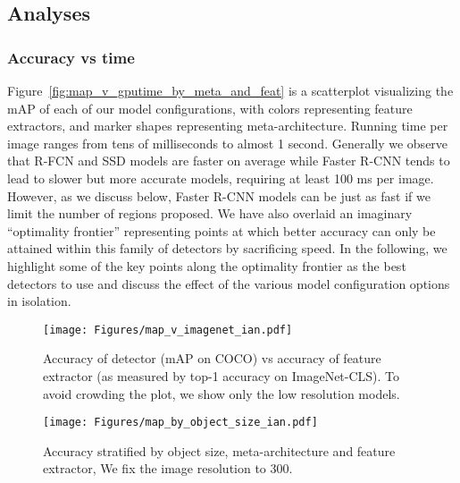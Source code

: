 \documentclass[10pt,twocolumn,letterpaper]{article}
\renewcommand{\paragraph}[1]{\subsubsection{#1}}
\begin{document}
\subsection{Analyses}



\paragraph{Accuracy vs time}

Figure~\ref{fig:map_v_gputime_by_meta_and_feat} is a scatterplot visualizing the mAP
of each of our model configurations,
with colors representing feature extractors, and marker shapes representing
meta-architecture.  Running time per image ranges from tens of
milliseconds to almost 1 second.   
Generally we observe that  R-FCN and SSD models are faster on average
while Faster R-CNN tends to lead to slower but more accurate models,
requiring at least 100 ms per image.  However, as we discuss below,
Faster R-CNN models can be just as fast if we limit the number of
regions proposed.  
We have also overlaid an imaginary ``optimality frontier''
representing points at which better accuracy can only be attained
within this family of detectors by sacrificing
speed.
In the following, we highlight some of the key points along
the optimality frontier as the best detectors to use and discuss the
effect of the various model configuration options in isolation. 



\begin{figure*}[t!]
\begin{center}
\texttt{[image: Figures/map\_v\_imagenet\_ian.pdf]}
\end{center}\vspace{-5mm}
\caption{
  \footnotesize
  Accuracy of detector (mAP on COCO) vs accuracy of feature extractor (as measured
  by top-1 accuracy on ImageNet-CLS). To avoid crowding the plot, we show only the low resolution models.
}
\label{fig:map_v_imagenet}
\end{figure*}


\begin{figure*}
\begin{center}
\texttt{[image: Figures/map\_by\_object\_size\_ian.pdf]}\vspace{-2mm}
\caption{
\footnotesize Accuracy stratified by  object size,  meta-architecture and feature extractor,
We fix the image resolution to 300.
}\vspace{-4mm}
\label{fig:map_by_object_size}
\end{center}
\end{figure*}
\end{document}
